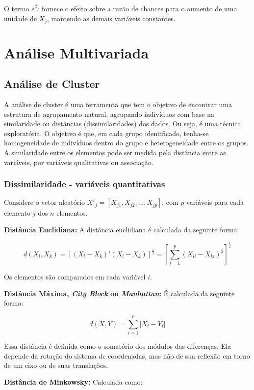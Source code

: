 \documentclass[
  portuguese,
]{estat/estat}
\let\oldsection\section
\renewcommand\section{\clearpage\oldsection}
\begin{document}
O termo \(e^{\beta_j}\) fornece o efeito sobre a razão de chances para o
aumento de uma unidade de \(X_j\), mantendo as demais variáveis
constantes.

\section{Análise Multivariada}\label{anuxe1lise-multivariada}

\subsection{Análise de Cluster}\label{anuxe1lise-de-cluster}

A análise de cluster é uma ferramenta que tem o objetivo de encontrar
uma estrutura de agrupamento natural, agrupando indivíduos com base na
similaridade ou distâncias (dissimilaridades) dos dados. Ou seja, é uma
técnica exploratória. O objetivo é que, em cada grupo identificado,
tenha-se homogeneidade de indivíduos dentro do grupo e heterogeneidade
entre os grupos. A similaridade entre os elementos pode ser medida pela
distância entre as variáveis, por variáveis qualitativas ou associação.

\subsubsection{Dissimilaridade - variáveis
quantitativas}\label{dissimilaridade---variuxe1veis-quantitativas}

Considere o vetor aleatório
\(X'_{j} = [X_{j1}, X_{j2}, \ldots, X_{jp}]\), com \(p\) variáveis para
cada elemento \(j\) dos \(n\) elementos.

\textbf{Distância Euclidiana:} A distância euclidiana é calculada da
seguinte forma:

\[
d(X_{l},X_{k}) = [(X_{l} - X_{k})'(X_{l} - X_{k})]^{\frac{1}{2}} = \left[ \sum_{i=1}^{p}(X_{li}-X_{ki})^2\right]^{\frac{1}{2}}
\]

Os elementos são comparados em cada variável \(i\).

\textbf{Distância Máxima, \emph{City Block} ou \emph{Manhattan}:} É
calculada da seguinte forma:

\[
d(X,Y) = \sum_{i=1}^{p} |X_{i} - Y_{i}|
\]

Essa distância é definida como o somatório dos módulos das diferenças.
Ela depende da rotação do sistema de coordenadas, mas não de sua
reflexão em torno de um eixo ou de suas translações.

\textbf{Distância de Minkowsky:} Calculada como:
\end{document}
